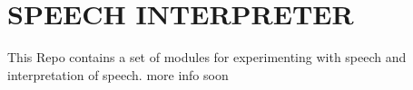 \chapter{SPEECH INTERPRETER}
\label{md__2home_2runner_2work_2speech_2speech_2gh-pages_2speech-interpreters_2README}
This Repo contains a set of modules for experimenting with speech and interpretation of speech. more info soon 